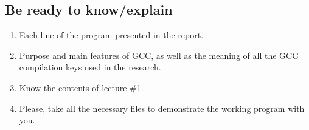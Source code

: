 { %
	\subsection{Be ready to know/explain}
	\begin{enumerate}
		\item Each line of the program presented in the report.
		\item Purpose and main features of GCC, as well as the meaning of all the GCC compilation keys used in the research.
		\item Know the contents of lecture \#1.
		\item Please, take all the necessary files to demonstrate the working program with you.
	\end{enumerate}
}